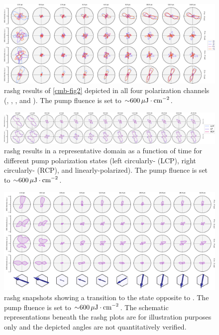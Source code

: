 \begin{landscape}
\begin{figure}
\centering
\includegraphics[width=\textwidth]{./gfx/ch6/full_fig2.pdf}
\caption{\label{cmb-fullnonequilibrium}\gls{rashg} results of \cref{cmb-fig2} depicted in all four polarization channels (\PP, \PS, \SP, and \SS).
The pump fluence is set to ${\sim} \qty{600}{\mu J \cdot cm^{-2}}$.}
\end{figure}
\end{landscape}

\begin{landscape}
\begin{figure}
\centering
\includegraphics[width=\textwidth]{./gfx/ch6/polarization.pdf}
\caption{\label{cmb-polarization}\gls{rashg} results in a representative domain as a function of time for different pump polarization states (left circularly- (LCP), right circularly- (RCP), and linearly-polarized).
The pump fluence is set to ${\sim} \qty{600}{\mu J \cdot cm^{-2}}$.
}
\end{figure}
\end{landscape}

\begin{landscape}
\begin{figure}
\centering
\includegraphics[width=\textwidth]{./gfx/ch6/C2B_short.pdf}
\caption{\label{cmb-CtoBshort}\gls{rashg} snapshots showing a transition to the state opposite to .
The pump fluence is set to ${\sim} \qty{600}{\mu J \cdot cm^{-2}}$.
\lastrow
The schematic representations beneath the \gls{rashg} plots are for illustration purposes only and the depicted angles are not quantitatively verified.
}
\end{figure}
\end{landscape}

